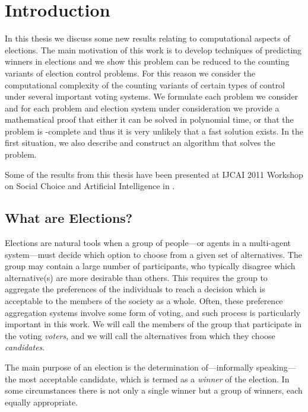 \chapter{Introduction} \label{ch:introduction}

In this thesis we discuss some new results relating to computational aspects of elections.
The main motivation of this work is to develop techniques of predicting winners in elections and we show this problem can be reduced to the counting variants of election control problems.
For this reason we consider the computational complexity of the counting variants of certain types of control under several important voting systems.
We formulate each problem we consider and for each problem and election system under consideration we provide a mathematical proof that either it can be solved in polynomial time, or that the problem is \sharpPclass-complete and thus it is very unlikely that a fast solution exists.
In the first situation, we also describe and construct an algorithm that solves the problem.

Some of the results from this thesis have been presented at IJCAI 2011 Workshop on Social Choice and Artificial Intelligence in \cite{faliszewski4}.

\section{What are Elections?} \label{sec:what-are-elections}

Elections are natural tools when a group of people---or agents in a multi-agent system---must decide which option to choose from a given set of alternatives.
The group may contain a large number of participants, who typically disagree which alternative(s) are more desirable than others.
This requires the group to aggregate the preferences of the individuals to reach a decision which is acceptable to the members of the society as a whole.
Often, these preference aggregation systems involve some form of voting, and such process is particularly important in this work.
We will call the members of the group that participate in the voting \emph{voters}, and we will call the alternatives from which they choose \emph{candidates}.

The main purpose of an election is the determination of---informally speaking---the most acceptable candidate, which is termed as a \emph{winner} of the election.
In some circumstances there is not only a single winner but a group of winners, each equally appropriate.

